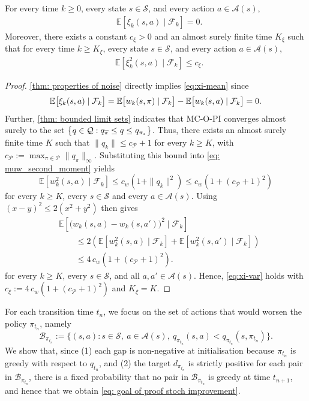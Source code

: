 \begin{lemma}
\label{thm: properties noise gap}
For every time $k \ge 0$,
every state $s \in \mathcal S$,
and every action $a \in \mathcal A(s)$,
\begin{align}
\label{eq:xi-mean}
&\mathbb E\!\left[ \xi_{k}(s,a) \mid \mathcal F_k \right] = 0 .
\end{align}
Moreover, there exists a constant $c_\xi>0$ 
and an almost surely finite time $K_\xi$ such that
for every time $k \ge K_\xi$,
every state $s \in \mathcal S$,
and every action $a \in \mathcal A(s)$,
\begin{align}
\label{eq:xi-var}
&\mathbb E\!\left[ \xi_{k}^2(s,a) \mid \mathcal F_k \right] \le c_\xi .
\end{align}
\end{lemma}
\begin{proof}
\autoref{thm: properties of noise} directly implies \eqref{eq:xi-mean} since
\[
\operatorname*{\mathbb{E}}\!\big[ \xi_{k}(s,a) \mid \mathcal F_k \big] 
=
\operatorname*{\mathbb{E}}\!\big[ w_{k}(s,\pi) \mid \mathcal F_k \big] - \operatorname*{\mathbb{E}}\!\big[ w_{k}(s,a) \mid \mathcal F_k \big] 
= 
0 .
\]
Further,
\autoref{thm: bounded limit sets} indicates that MC-O-PI converges almost surely to the set $\bigl\{ q \in \mathcal Q : q_{\overline{\pi}} \le q \le q_{{\pi}_*}
\bigr\}$.
Thus, there exists an almost surely finite time $K$ such that $\| q_k \| \le c_{\mathcal P} + 1$ for every $k \ge K$,
with $c_{\mathcal P} := \max_{\pi \in \mathcal P}\| q_\pi \|_\infty$.
Substituting this bound into \eqref{eq: muw_second_moment} yields
\[
\mathbb E[w_k^2(s,a) \mid \mathcal F_k] 
\le c_w(1+\|q_k\|^2)
\le c_w(1+(c_{\mathcal P} + 1)^2)
\]
for every $k \ge K$, every $s \in \mathcal S$ and every $a \in \mathcal A(s)$.
Using $(x-y)^2 \le 2 ( x^2 + y^2)$ then gives
\begin{align*}   
&\mathbb E\!\left[ \bigl(w_k(s,a) - w_k(s,a') \bigr)^2 \mid \mathcal F_k \right]
\\
&\qquad\le
2 \left( \mathbb E\!\left[ w_k^2(s,a) \mid \mathcal F_k \right] 
+ \mathbb E\!\left[ w_k^2(s,a') \mid \mathcal F_k \right] \right)
\\
&\qquad\le
4 \, c_w \left( 1 + (c_{\mathcal P}+1)^2 \right) .
\end{align*}
for every $k \ge K$, every $s \in \mathcal S$, and all $a, a' \in \mathcal A(s)$.
Hence, \eqref{eq:xi-var} holds with $c_\xi := 4 \, c_w \left( 1 + (c_{\mathcal P}+1)^2 \right)$ and $K_\xi = K$.
\end{proof}


For each transition time $t_n$,
we focus on the set of actions that would worsen the policy $\pi_{t_n}$, namely
\[
\mathcal B_{\pi_{t_n}} := \big\{ (s,a) : s \in \mathcal S, \ a \in \mathcal A(s), \ q_{\pi_{t_n}}(s,a) < q_{\pi_{t_n}}(s, \pi_{t_n}) \big\} .
\]
We show that, since
(1) each gap is non-negative at initialisation because $\pi_{t_n}$ is greedy with respect to $q_{t_n}$,
and (2) the target $d_{\pi_{t_n}}$ is strictly positive for each pair in $\mathcal B_{\pi_{t_n}}$,
there is a fixed probability that no pair in $\mathcal B_{\pi_{t_n}}$ is greedy at time $t_{n+1}$, and hence that we obtain \eqref{eq: goal of proof stoch improvement}.

